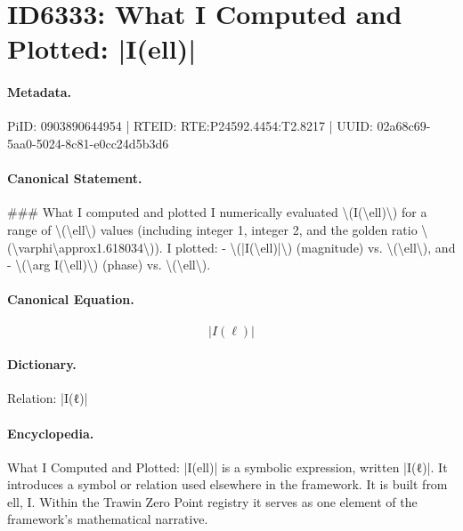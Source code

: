 \section*{ID6333: What I Computed and Plotted: |I(ell)|}
\paragraph{Metadata.}
PiID: 0903890644954 | RTEID: RTE:P24592.4454:T2.8217 | UUID: 02a68c69-5aa0-5024-8c81-e0cc24d5b3d6

\paragraph{Canonical Statement.}
\#\#\# What I computed and plotted I numerically evaluated \textbackslash{}(I(\textbackslash{}ell)\textbackslash{}) for a range of \textbackslash{}(\textbackslash{}ell\textbackslash{}) values (including integer 1, integer 2, and the golden ratio \textbackslash{}(\textbackslash{}varphi\textbackslash{}approx1.618034\textbackslash{})). I plotted: - \textbackslash{}(|I(\textbackslash{}ell)|\textbackslash{}) (magnitude) vs. \textbackslash{}(\textbackslash{}ell\textbackslash{}), and - \textbackslash{}(\textbackslash{}arg I(\textbackslash{}ell)\textbackslash{}) (phase) vs. \textbackslash{}(\textbackslash{}ell\textbackslash{}).

\paragraph{Canonical Equation.}
\[
|I(\ell)|
\]

\paragraph{Dictionary.}
Relation: |I(ℓ)|

\paragraph{Encyclopedia.}
What I Computed and Plotted: |I(ell)| is a symbolic expression, written |I(ℓ)|. It introduces a symbol or relation used elsewhere in the framework. It is built from ell, I. Within the Trawin Zero Point registry it serves as one element of the framework's mathematical narrative.

